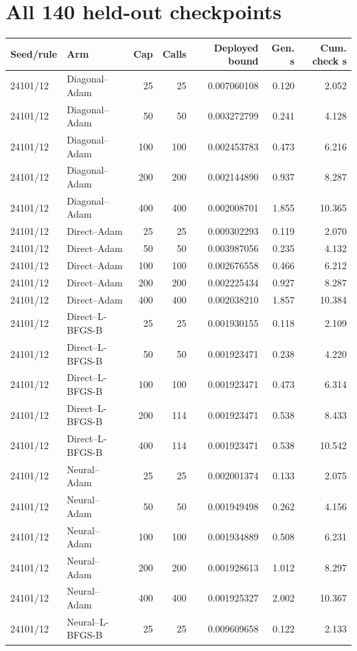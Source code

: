 \section{All 140 held-out checkpoints}\small
\begin{longtable}{llrrrrr}\toprule Seed/rule & Arm & Cap & Calls & Deployed bound & Gen. s & Cum. check s\\\midrule\endhead
24101/12 & Diagonal--Adam & 25 & 25 & 0.007060108 & 0.120 & 2.052\\
24101/12 & Diagonal--Adam & 50 & 50 & 0.003272799 & 0.241 & 4.128\\
24101/12 & Diagonal--Adam & 100 & 100 & 0.002453783 & 0.473 & 6.216\\
24101/12 & Diagonal--Adam & 200 & 200 & 0.002144890 & 0.937 & 8.287\\
24101/12 & Diagonal--Adam & 400 & 400 & 0.002008701 & 1.855 & 10.365\\
24101/12 & Direct--Adam & 25 & 25 & 0.009302293 & 0.119 & 2.070\\
24101/12 & Direct--Adam & 50 & 50 & 0.003987056 & 0.235 & 4.132\\
24101/12 & Direct--Adam & 100 & 100 & 0.002676558 & 0.466 & 6.212\\
24101/12 & Direct--Adam & 200 & 200 & 0.002225434 & 0.927 & 8.287\\
24101/12 & Direct--Adam & 400 & 400 & 0.002038210 & 1.857 & 10.384\\
24101/12 & Direct--L-BFGS-B & 25 & 25 & 0.001930155 & 0.118 & 2.109\\
24101/12 & Direct--L-BFGS-B & 50 & 50 & 0.001923471 & 0.238 & 4.220\\
24101/12 & Direct--L-BFGS-B & 100 & 100 & 0.001923471 & 0.473 & 6.314\\
24101/12 & Direct--L-BFGS-B & 200 & 114 & 0.001923471 & 0.538 & 8.433\\
24101/12 & Direct--L-BFGS-B & 400 & 114 & 0.001923471 & 0.538 & 10.542\\
24101/12 & Neural--Adam & 25 & 25 & 0.002001374 & 0.133 & 2.075\\
24101/12 & Neural--Adam & 50 & 50 & 0.001949498 & 0.262 & 4.156\\
24101/12 & Neural--Adam & 100 & 100 & 0.001934889 & 0.508 & 6.231\\
24101/12 & Neural--Adam & 200 & 200 & 0.001928613 & 1.012 & 8.297\\
24101/12 & Neural--Adam & 400 & 400 & 0.001925327 & 2.002 & 10.367\\
24101/12 & Neural--L-BFGS-B & 25 & 25 & 0.009609658 & 0.122 & 2.133\\

\end{longtable}

